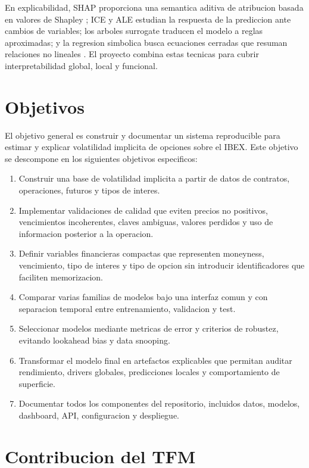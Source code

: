 En explicabilidad, SHAP proporciona una semantica aditiva de atribucion basada en valores de Shapley \citep{shapley1953value,lundberg2017shap}; ICE y ALE estudian la respuesta de la prediccion ante cambios de variables; los arboles surrogate traducen el modelo a reglas aproximadas; y la regresion simbolica busca ecuaciones cerradas que resuman relaciones no lineales \citep{cranmer2020symbolic}. El proyecto combina estas tecnicas para cubrir interpretabilidad global, local y funcional.

\section{Objetivos}

El objetivo general es construir y documentar un sistema reproducible para estimar y explicar volatilidad implicita de opciones sobre el IBEX. Este objetivo se descompone en los siguientes objetivos especificos:

\begin{enumerate}
  \item Construir una base de volatilidad implicita a partir de datos de contratos, operaciones, futuros y tipos de interes.
  \item Implementar validaciones de calidad que eviten precios no positivos, vencimientos incoherentes, claves ambiguas, valores perdidos y uso de informacion posterior a la operacion.
  \item Definir variables financieras compactas que representen moneyness, vencimiento, tipo de interes y tipo de opcion sin introducir identificadores que faciliten memorizacion.
  \item Comparar varias familias de modelos bajo una interfaz comun y con separacion temporal entre entrenamiento, validacion y test.
  \item Seleccionar modelos mediante metricas de error y criterios de robustez, evitando lookahead bias y data snooping.
  \item Transformar el modelo final en artefactos explicables que permitan auditar rendimiento, drivers globales, predicciones locales y comportamiento de superficie.
  \item Documentar todos los componentes del repositorio, incluidos datos, modelos, dashboard, API, configuracion y despliegue.
\end{enumerate}

\section{Contribucion del TFM}

